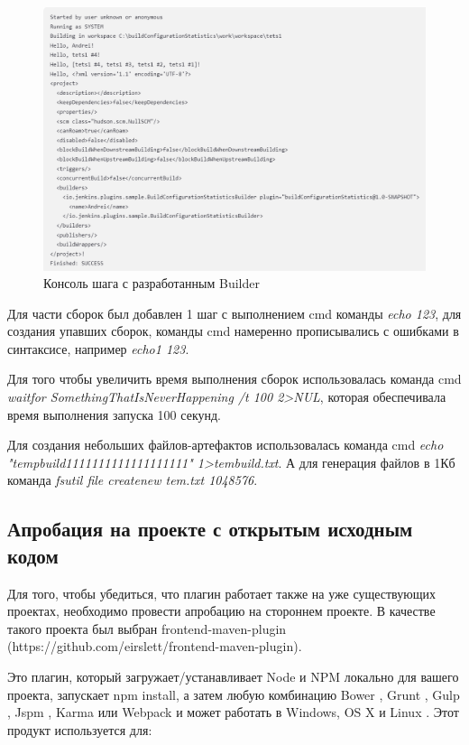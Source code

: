  \begin{figure}[ht!] 
	\center
	\includegraphics [scale=0.57] {my_folder/images//console1}
	\caption{Консоль шага с разработанным Builder} 
	\label{fig:customBuilder}  
\end{figure}



Для части сборок был добавлен 1 шаг с выполнением cmd команды  \textit{echo 123}, для создания упавших сборок, команды cmd намеренно прописывались с ошибками в синтаксисе, например  \textit{echo1 123}.

Для того чтобы увеличить время выполнения сборок использовалась команда cmd  \textit{waitfor SomethingThatIsNeverHappening /t 100  2>NUL}, которая обеспечивала время выполнения запуска 100 секунд.

Для создания небольших файлов-артефактов использовалась команда cmd \textit{echo "tempbuild1111111111111111111"  1>tembuild.txt}. А для генерация файлов в 1Кб команда \textit{fsutil file createnew tem.txt 1048576}.

\subsection{Апробация на проекте с открытым исходным кодом}

Для того, чтобы убедиться, что плагин работает также на уже существующих проектах, необходимо провести апробацию на стороннем проекте. В качестве такого проекта был выбран frontend-maven-plugin (https://github.com/eirslett/frontend-maven-plugin). 

Это плагин, который загружает/устанавливает Node и NPM локально для вашего проекта, запускает npm install, а затем любую комбинацию Bower , Grunt , Gulp , Jspm , Karma или Webpack и может работать в Windows, OS X и Linux \cite{frontplugin}. Этот продукт используется для:

